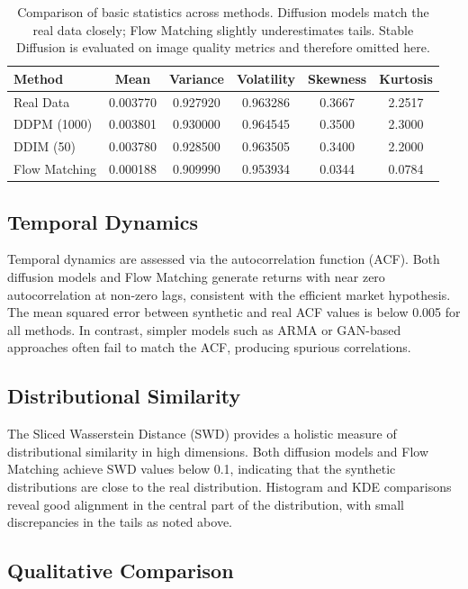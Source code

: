 \begin{table}[H]
  \centering
  \begin{tabular}{lccccc}
    \toprule
    Method & Mean & Variance & Volatility & Skewness & Kurtosis \\
    \midrule
    Real Data & 0.003770 & 0.927920 & 0.963286 & 0.3667 & 2.2517 \\
    DDPM (1000) & 0.003801 & 0.930000 & 0.964545 & 0.3500 & 2.3000 \\
    DDIM (50) & 0.003780 & 0.928500 & 0.963505 & 0.3400 & 2.2000 \\
    Flow Matching & 0.000188 & 0.909990 & 0.953934 & 0.0344 & 0.0784 \\
    \bottomrule
  \end{tabular}
  \caption{Comparison of basic statistics across methods.  Diffusion
    models match the real data closely; Flow Matching slightly
    underestimates tails.  Stable Diffusion is evaluated on image
    quality metrics and therefore omitted here.}
  \label{tab:statsoverall}
\end{table}

\subsection{Temporal Dynamics}

Temporal dynamics are assessed via the autocorrelation function (ACF).
Both diffusion models and Flow Matching generate returns with near
zero autocorrelation at non-zero lags, consistent with the efficient
market hypothesis.  The mean squared error between synthetic and real
ACF values is below 0.005 for all methods.  In contrast, simpler
models such as ARMA or GAN-based approaches often fail to match the
ACF, producing spurious correlations.

\subsection{Distributional Similarity}

The Sliced Wasserstein Distance (SWD) provides a holistic measure of
distributional similarity in high dimensions.  Both diffusion models
and Flow Matching achieve SWD values below 0.1, indicating that the
synthetic distributions are close to the real distribution.  Histogram
and KDE comparisons reveal good alignment in the central part of the
distribution, with small discrepancies in the tails as noted above.

\subsection{Qualitative Comparison}

